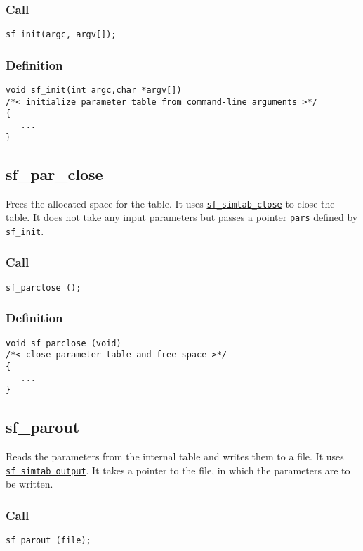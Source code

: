 \subsubsection*{Call}
\begin{verbatim}sf_init(argc, argv[]);\end{verbatim}

\subsubsection*{Definition}
\begin{verbatim}
void sf_init(int argc,char *argv[]) 
/*< initialize parameter table from command-line arguments >*/
{
   ...
}
\end{verbatim}




\subsection{{sf\_par\_close}}
Frees the allocated space for the table. It uses \hyperref[sec:sf_simtab_close]{\texttt{sf\_simtab\_close}} to close the table. It does not take any input parameters but passes a pointer \texttt{pars} defined by \texttt{sf\_init}.

\subsubsection*{Call}
\begin{verbatim}sf_parclose ();\end{verbatim}

\subsubsection*{Definition}
\begin{verbatim}
void sf_parclose (void)
/*< close parameter table and free space >*/
{
   ...
}
\end{verbatim}




\subsection{{sf\_parout}}
Reads the parameters from the internal table and writes them to a file. It uses \hyperref[sec:sf_simtab_output]{\texttt{sf\_simtab\_output}}. It takes a pointer to the file, in which the parameters are to be written.

\subsubsection*{Call}
\begin{verbatim}sf_parout (file);\end{verbatim}

